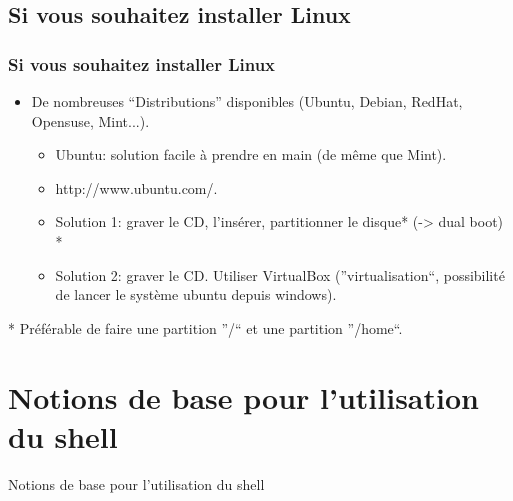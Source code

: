 \documentclass[10pt, xcolor=dvipsnames]{beamer}
\begin{document}
\subsection{Si vous souhaitez installer Linux}
\begin{frame}[fragile]
\frametitle{Si vous souhaitez installer Linux}
\begin{itemize}
\item De nombreuses ``Distributions'' disponibles (Ubuntu, Debian, RedHat, Opensuse, Mint...).
 \begin{itemize}
	\item Ubuntu: solution facile à prendre en main (de même que Mint).
	\item http://www.ubuntu.com/.
\item Solution 1: graver le CD, l'insérer, partitionner le disque* (-> dual boot) *
\item Solution 2: graver le CD. Utiliser VirtualBox (''virtualisation``, possibilité de lancer le système ubuntu depuis windows).
\end{itemize}
\end{itemize}

\scriptsize
* Préférable de faire une partition ''/`` et une partition ''/home``.
\normalsize
\end{frame}
% 
% 


\section{Notions de base pour l'utilisation du shell}
\frame
{
\begin{block}{}
\begin{center}
\begin{huge}
Notions de base pour l'utilisation du shell
 \end{huge}
\end{center}
\end{block}

}
\end{document}
